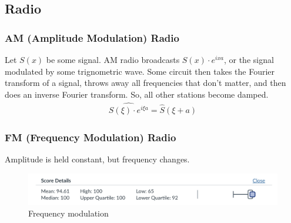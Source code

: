 \subsection{Radio}
\subsubsection{AM (Amplitude Modulation) Radio}
Let $S(x)$ be some signal. AM radio broadcasts $S(x) \cdot e^{ixa}$, or the signal modulated by some trignometric wave. Some circuit then takes the Fourier transform of a signal, throws away all frequencies that don't matter, and then does an inverse Fourier transform. So, all other stations become damped.
\begin{align}
    \widehat{S(\xi) \cdot e^{i\xi a}} = \hat{S}(\xi + a)
\end{align}

\subsubsection{FM (Frequency Modulation) Radio}
Amplitude is held constant, but frequency changes.
\begin{figure}[h!]
    \centering
    \includegraphics[width=0.3\linewidth]{image.png}
    \caption{Frequency modulation}
\end{figure}

